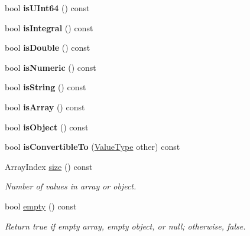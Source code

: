 \begin{DoxyCompactItemize}
bool {\bfseries is\+U\+Int64} () const
\item 
\mbox{\label{classJson_1_1Value_ab6798954f6e80281cf22708ef45198a7}} 
bool {\bfseries is\+Integral} () const
\item 
\mbox{\label{classJson_1_1Value_a4a2e2a790e19a1c09fc5dd12d7ad47b5}} 
bool {\bfseries is\+Double} () const
\item 
\mbox{\label{classJson_1_1Value_af961a000cd203c895e44c195ab39b866}} 
bool {\bfseries is\+Numeric} () const
\item 
\mbox{\label{classJson_1_1Value_a71e1f82cf1c3eaf969d400dcffb163a6}} 
bool {\bfseries is\+String} () const
\item 
\mbox{\label{classJson_1_1Value_a1627eb9d6568d6d0252fa8bb711c0a59}} 
bool {\bfseries is\+Array} () const
\item 
\mbox{\label{classJson_1_1Value_a8cf96c0f2a552051fcfc78ffee60e037}} 
bool {\bfseries is\+Object} () const
\item 
\mbox{\label{classJson_1_1Value_af1ee6be27a96a7d12128efdd60deb54d}} 
bool {\bfseries is\+Convertible\+To} (\hyperlink{namespaceJson_a7d654b75c16a57007925868e38212b4e}{Value\+Type} other) const
\item 
\mbox{\label{classJson_1_1Value_a0ec2808e1d7efa4e9fad938d6667be44}} 
Array\+Index \hyperlink{classJson_1_1Value_a0ec2808e1d7efa4e9fad938d6667be44}{size} () const
\begin{DoxyCompactList}\small\item\em Number of values in array or object. \end{DoxyCompactList}\item 
\mbox{\label{classJson_1_1Value_a0519a551e37ee6665d74742b3f96bab3}} 
bool \hyperlink{classJson_1_1Value_a0519a551e37ee6665d74742b3f96bab3}{empty} () const
\begin{DoxyCompactList}\small\item\em Return true if empty array, empty object, or null; otherwise, false. \end{DoxyCompactList}\item 

\end{DoxyCompactItemize}
